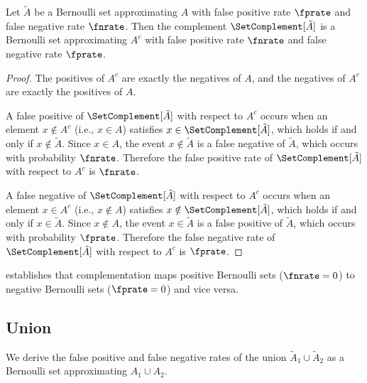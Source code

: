 \begin{theorem}
\label{thm:complement_rates}
Let $\tilde{A}$ be a Bernoulli set approximating $A$ with false positive
rate $\fprate$ and false negative rate $\fnrate$.
Then the complement $\SetComplement[\tilde{A}]$ is a Bernoulli set
approximating $A^c$ with false positive rate $\fnrate$ and false negative
rate $\fprate$.
\end{theorem}
\begin{proof}
The positives of $A^c$ are exactly the negatives of $A$, and the negatives
of $A^c$ are exactly the positives of $A$.

A false positive of $\SetComplement[\tilde{A}]$ with respect to $A^c$
occurs when an element $x \notin A^c$ (i.e., $x \in A$) satisfies
$x \in \SetComplement[\tilde{A}]$, which holds if and only if
$x \notin \tilde{A}$.
Since $x \in A$, the event $x \notin \tilde{A}$ is a false negative of
$\tilde{A}$, which occurs with probability $\fnrate$.
Therefore the false positive rate of $\SetComplement[\tilde{A}]$ with
respect to $A^c$ is $\fnrate$.

A false negative of $\SetComplement[\tilde{A}]$ with respect to $A^c$
occurs when an element $x \in A^c$ (i.e., $x \notin A$) satisfies
$x \notin \SetComplement[\tilde{A}]$, which holds if and only if
$x \in \tilde{A}$.
Since $x \notin A$, the event $x \in \tilde{A}$ is a false positive of
$\tilde{A}$, which occurs with probability $\fprate$.
Therefore the false negative rate of $\SetComplement[\tilde{A}]$ with
respect to $A^c$ is $\fprate$.
\end{proof}

\begin{remark}
 establishes that complementation maps positive
Bernoulli sets ($\fnrate = 0$) to negative Bernoulli sets ($\fprate = 0$)
and vice versa.
\end{remark}

\subsection{Union}
\label{sec:union}
We derive the false positive and false negative rates of the union
$\tilde{A}_1 \cup \tilde{A}_2$ as a Bernoulli set approximating
$A_1 \cup A_2$.

